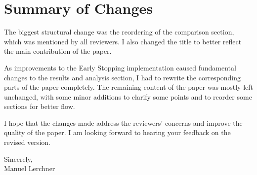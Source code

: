 \documentclass[12pt,a4paper]{article}
\begin{document}
\section*{Summary of Changes}

The biggest structural change was the reordering of the comparison section, which was mentioned by all reviewers. I also changed the title to better reflect the main contribution of the paper.

As improvements to the Early Stopping implementation caused fundamental changes to the results and analysis section, I had to rewrite the corresponding parts of the paper completely. The remaining content of the paper was mostly left unchanged, with some minor additions to clarify some points and to reorder some sections for better flow.

I hope that the changes made address the reviewers' concerns and improve the quality of the paper. I am looking forward to hearing your feedback on the revised version.

\vspace{1em}

\noindent Sincerely,\\
Manuel Lerchner
\end{document}
